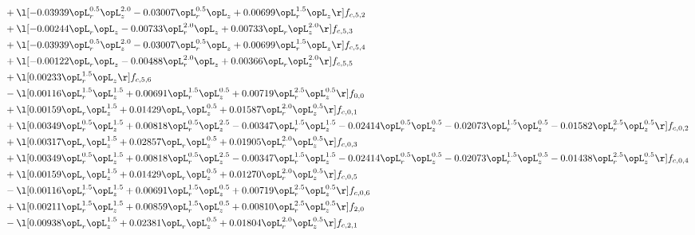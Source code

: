 \begin{alignat}{2}
& + \l[  -0.03939 \opL_r^{0.5} \opL_z^{2.0}   -0.03007 \opL_r^{0.5} \opL_z +  0.00699 \opL_r^{1.5} \opL_z  \r] f_{c,5,2} \nonumber \\ 
& + \l[  -0.00244 \opL_r \opL_z   -0.00733 \opL_r^{2.0} \opL_z +  0.00733 \opL_r \opL_z^{2.0}  \r] f_{c,5,3} \nonumber \\ 
& + \l[  -0.03939 \opL_r^{0.5} \opL_z^{2.0}   -0.03007 \opL_r^{0.5} \opL_z +  0.00699 \opL_r^{1.5} \opL_z  \r] f_{c,5,4} \nonumber \\ 
& + \l[  -0.00122 \opL_r \opL_z   -0.00488 \opL_r^{2.0} \opL_z +  0.00366 \opL_r \opL_z^{2.0}  \r] f_{c,5,5} \nonumber \\ 
& + \l[  0.00233 \opL_r^{1.5} \opL_z  \r] f_{c,5,6} \nonumber \\ 
& - \l[  0.00116 \opL_r^{1.5} \opL_z^{1.5} +  0.00691 \opL_r^{1.5} \opL_z^{0.5} +  0.00719 \opL_r^{2.5} \opL_z^{0.5}  \r] f_{0,0} \nonumber \\ 
& + \l[  0.00159 \opL_r \opL_z^{1.5} +  0.01429 \opL_r \opL_z^{0.5} +  0.01587 \opL_r^{2.0} \opL_z^{0.5}  \r] f_{c,0,1} \nonumber \\ 
& + \l[  0.00349 \opL_r^{0.5} \opL_z^{1.5} +  0.00818 \opL_r^{0.5} \opL_z^{2.5}   -0.00347 \opL_r^{1.5} \opL_z^{1.5}   -0.02414 \opL_r^{0.5} \opL_z^{0.5}   -0.02073 \opL_r^{1.5} \opL_z^{0.5}   -0.01582 \opL_r^{2.5} \opL_z^{0.5}  \r] f_{c,0,2} \nonumber \\ 
& + \l[  0.00317 \opL_r \opL_z^{1.5} +  0.02857 \opL_r \opL_z^{0.5} +  0.01905 \opL_r^{2.0} \opL_z^{0.5}  \r] f_{c,0,3} \nonumber \\ 
& + \l[  0.00349 \opL_r^{0.5} \opL_z^{1.5} +  0.00818 \opL_r^{0.5} \opL_z^{2.5}   -0.00347 \opL_r^{1.5} \opL_z^{1.5}   -0.02414 \opL_r^{0.5} \opL_z^{0.5}   -0.02073 \opL_r^{1.5} \opL_z^{0.5}   -0.01438 \opL_r^{2.5} \opL_z^{0.5}  \r] f_{c,0,4} \nonumber \\ 
& + \l[  0.00159 \opL_r \opL_z^{1.5} +  0.01429 \opL_r \opL_z^{0.5} +  0.01270 \opL_r^{2.0} \opL_z^{0.5}  \r] f_{c,0,5} \nonumber \\ 
& - \l[  0.00116 \opL_r^{1.5} \opL_z^{1.5} +  0.00691 \opL_r^{1.5} \opL_z^{0.5} +  0.00719 \opL_r^{2.5} \opL_z^{0.5}  \r] f_{c,0,6} \nonumber \\ 
& + \l[  0.00211 \opL_r^{1.5} \opL_z^{1.5} +  0.00859 \opL_r^{1.5} \opL_z^{0.5} +  0.00810 \opL_r^{2.5} \opL_z^{0.5}  \r] f_{2,0} \nonumber \\ 
& - \l[  0.00938 \opL_r \opL_z^{1.5} +  0.02381 \opL_r \opL_z^{0.5} +  0.01804 \opL_r^{2.0} \opL_z^{0.5}  \r] f_{c,2,1} \nonumber \\ 

\end{alignat}
